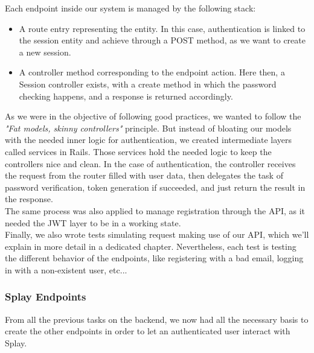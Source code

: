 \documentclass{eplmastersthesis}
\begin{document}
          Each endpoint inside our system is managed by the following stack:

          \begin{itemize}
            \item A route entry representing the entity. In this case,
            authentication is linked to the session entity and achieve through
            a POST method, as we want to create a new session.
            \item A controller method corresponding to the endpoint action.
            Here then, a Session controller exists, with a create method in
            which the password checking happens, and a response is returned
            accordingly.
          \end{itemize}

          As we were in the objective of following good practices, we wanted
          to follow the \textit{"Fat models, skinny controllers"} principle.
          But instead of bloating our models with the needed inner logic for
          authentication, we created intermediate layers called services
          in Rails. Those services hold the needed logic to keep the controllers
          nice and clean. In the case of authentication, the controller receives
          the request from the router filled with user data, then delegates
          the task of password verification, token generation if succeeded,
          and just return the result in the response.\\

          The same process was also applied to manage registration through
          the API, as it needed the JWT layer to be in a working state.\\

          Finally, we also wrote tests simulating request making use of our
          API, which we'll explain in more detail in a dedicated chapter.
          Nevertheless, each test is testing the different behavior of
          the endpoints, like registering with a bad email, logging in with
          a non-existent user, etc...

        \subsubsection{Splay Endpoints}

          From all the previous tasks on the backend, we now had all the
          necessary basis to create the other endpoints in order to let
          an authenticated user interact with Splay.\\
\end{document}
